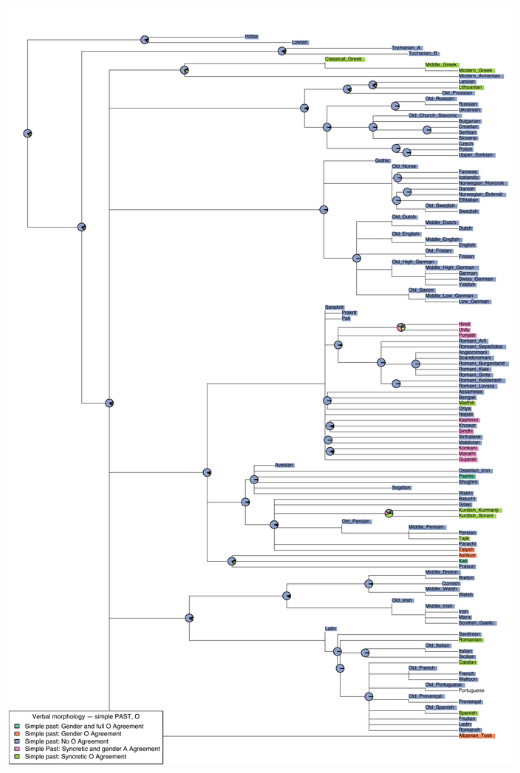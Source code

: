 \includegraphics[width=.9\linewidth]{supp-graphics/VerbalmorphologysimplePASTOPSTNOOAGRVerbalmorphologysimplePASTOPSTOAGRFULLVerbalmorphologysimplePASTOPSTOGenderAGR.pdf}


